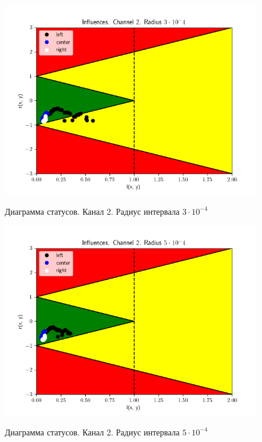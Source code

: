 \begin{figure}[H]
	\begin{center}
		\includegraphics[scale=0.83]{status_ch2_rad3}
		\label{pic:ch23}
		\caption{Диаграмма статусов. Канал 2. Радиус интервала $3 \cdot 10 ^ {-4}$}
	\end{center}
\end{figure}

\begin{figure}[H]
	\begin{center}
		\includegraphics[scale=0.83]{status_ch2_rad5}
		\label{pic:ch25}
		\caption{Диаграмма статусов. Канал 2. Радиус интервала $5 \cdot 10 ^ {-4}$}
	\end{center}
\end{figure}

